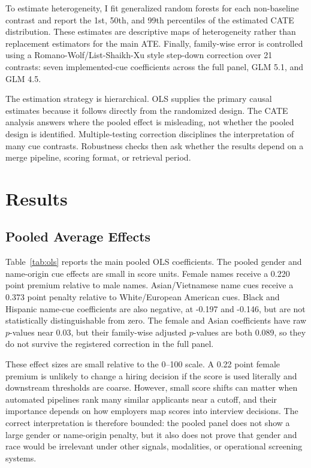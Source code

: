 \documentclass[10pt,twocolumn,letterpaper]{article}
\begin{document}
To estimate heterogeneity, I fit generalized random forests for each non-baseline contrast and report the 1st, 50th, and 99th percentiles of the estimated CATE distribution. These estimates are descriptive maps of heterogeneity rather than replacement estimators for the main ATE. Finally, family-wise error is controlled using a Romano-Wolf/List-Shaikh-Xu style step-down correction over 21 contrasts: seven implemented-cue coefficients across the full panel, GLM 5.1, and GLM 4.5.

The estimation strategy is hierarchical. OLS supplies the primary causal estimates because it follows directly from the randomized design. The CATE analysis answers where the pooled effect is misleading, not whether the pooled design is identified. Multiple-testing correction disciplines the interpretation of many cue contrasts. Robustness checks then ask whether the results depend on a merge pipeline, scoring format, or retrieval period.

\section{Results}

\subsection{Pooled Average Effects}

Table~\ref{tab:ols} reports the main pooled OLS coefficients. The pooled gender and name-origin cue effects are small in score units. Female names receive a 0.220 point premium relative to male names. Asian/Vietnamese name cues receive a 0.373 point penalty relative to White/European American cues. Black and Hispanic name-cue coefficients are also negative, at -0.197 and -0.146, but are not statistically distinguishable from zero. The female and Asian coefficients have raw $p$-values near 0.03, but their family-wise adjusted $p$-values are both 0.089, so they do not survive the registered correction in the full panel.

These effect sizes are small relative to the 0--100 scale. A 0.22 point female premium is unlikely to change a hiring decision if the score is used literally and downstream thresholds are coarse. However, small score shifts can matter when automated pipelines rank many similar applicants near a cutoff, and their importance depends on how employers map scores into interview decisions. The correct interpretation is therefore bounded: the pooled panel does not show a large gender or name-origin penalty, but it also does not prove that gender and race would be irrelevant under other signals, modalities, or operational screening systems.
\end{document}
